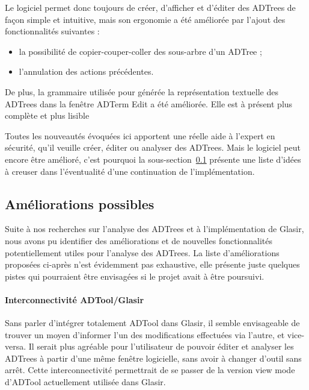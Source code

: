 Le logiciel permet donc toujours de créer, d'afficher et d'éditer des ADTrees de façon simple et intuitive, mais son ergonomie a été améliorée par l'ajout des fonctionnalités suivantes :
\begin{itemize}
    \item la possibilité de copier-couper-coller 
		des sous-arbre d'un ADTree ;
    \item l'annulation des actions précédentes.
\end{itemize}

De plus, la grammaire utilisée pour générée  la représentation textuelle des ADTrees dans la fenêtre \og ADTerm Edit \fg{} a été améliorée. Elle est à présent plus complète et plus lisible 

Toutes les nouveautés évoquées ici apportent une réelle aide à l'expert en sécurité, qu'il veuille créer, éditer ou analyser des ADTrees. Mais le logiciel peut encore être amélioré, c'est pourquoi la {\sc sous-section}~\ref{subsec:encorePlusMieux} présente une liste d'idées à creuser dans l'éventualité d'une continuation de l'implémentation.

\subsection{Améliorations possibles}
\label{subsec:encorePlusMieux}

Suite à nos recherches sur l'analyse des ADTrees et à l'implémentation de Glasir, nous avons pu identifier des améliorations et de nouvelles fonctionnalités potentiellement utiles pour l'analyse des ADTrees. La liste d'améliorations proposées ci-après n'est évidemment pas exhaustive, elle présente juste quelques pistes qui pourraient être envisagées si le projet avait à être poursuivi.

\paragraph{Interconnectivité ADTool/Glasir} Sans parler d'intégrer totalement ADTool dans Glasir, il semble envisageable de trouver un moyen d'informer l'un des modifications effectuées via l'autre, et vice-versa. Il serait plus agréable pour l'utilisateur de pouvoir éditer et analyser les ADTrees à partir d'une même fenêtre logicielle, sans avoir à changer d'outil sans arrêt. Cette interconnectivité permettrait de se passer de la version \og view mode \fg{} d'ADTool actuellement utilisée dans Glasir. 

